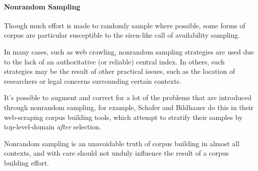 



\paragraph{Nonrandom Sampling}
Though much effort is made to randomly sample where possible, some forms of corpus are particular susceptible to the siren-like call of availability sampling.

In many cases, such as web crawling, nonrandom sampling strategies are used due to the lack of an authoritative (or reliable) central index.  In others, such strategies may be the result of other practical issues, such as the location of researchers or legal concerns surrounding certain contexts.

It's possible to augment and correct for a lot of the problems that are introduced through nonrandom sampling, for example, Schafer and Bildhauer do this in their web-scraping corpus building tools, which attempt to stratify their samples by top-level-domain \textsl{after} selection\cite{schafer2014focused}.

Nonrandom sampling is an unavoidable truth of corpus building in almost all contexts, and with care should not unduly influence the result of a corpus building effort.





